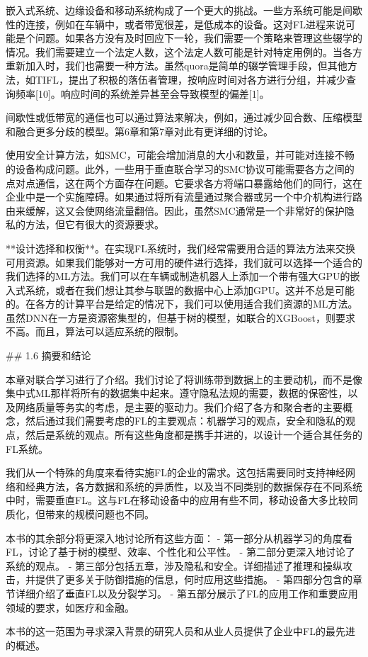 嵌入式系统、边缘设备和移动系统构成了一个更大的挑战。一些方系统可能是间歇性的连接，例如在车辆中，或者带宽很差，是低成本的设备。这对FL进程来说可能是个问题。如果各方没有及时回应下一轮，我们需要一个策略来管理这些辍学的情况。我们需要建立一个法定人数，这个法定人数可能是针对特定用例的。当各方重新加入时，我们也需要一种方法。虽然quora是简单的辍学管理手段，但其他方法，如TIFL，提出了积极的落伍者管理，按响应时间对各方进行分组，并减少查询频率[10]。响应时间的系统差异甚至会导致模型的偏差[1]。

间歇性或低带宽的通信也可以通过算法来解决，例如，通过减少回合数、压缩模型和融合更多分歧的模型。第6章和第7章对此有更详细的讨论。

使用安全计算方法，如SMC，可能会增加消息的大小和数量，并可能对连接不畅的设备构成问题。此外，一些用于垂直联合学习的SMC协议可能需要各方之间的点对点通信，这在两个方面存在问题。它要求各方将端口暴露给他们的同行，这在企业中是一个实施障碍。如果通过将所有流量通过聚合器或另一个中介机构进行路由来缓解，这又会使网络流量翻倍。因此，虽然SMC通常是一个非常好的保护隐私的方法，但它有很大的资源要求。

**设计选择和权衡**。在实现FL系统时，我们经常需要用合适的算法方法来交换可用资源。如果我们能够对一方可用的硬件进行选择，我们就可以选择一个适合的我们选择的ML方法。我们可以在车辆或制造机器人上添加一个带有强大GPU的嵌入式系统，或者在我们想让其参与联盟的数据中心上添加GPU。这并不总是可能的。在各方的计算平台是给定的情况下，我们可以使用适合我们资源的ML方法。虽然DNN在一方是资源密集型的，但基于树的模型，如联合的XGBoost，则要求不高。而且，算法可以适应系统的限制。

## 1.6 摘要和结论

本章对联合学习进行了介绍。我们讨论了将训练带到数据上的主要动机，而不是像集中式ML那样将所有的数据集中起来。遵守隐私法规的需要，数据的保密性，以及网络质量等务实的考虑，是主要的驱动力。我们介绍了各方和聚合者的主要概念，然后通过我们需要考虑的FL的主要观点：机器学习的观点，安全和隐私的观点，然后是系统的观点。所有这些角度都是携手并进的，以设计一个适合其任务的FL系统。

我们从一个特殊的角度来看待实施FL的企业的需求。这包括需要同时支持神经网络和经典方法，各方数据和系统的异质性，以及当不同类别的数据保存在不同系统中时，需要垂直FL。这与FL在移动设备中的应用有些不同，移动设备大多比较同质化，但带来的规模问题也不同。

本书的其余部分将更深入地讨论所有这些方面：
- 第一部分从机器学习的角度看FL，讨论了基于树的模型、效率、个性化和公平性。
- 第二部分更深入地讨论了系统的观点。
- 第三部分包括五章，涉及隐私和安全。详细描述了推理和操纵攻击，并提供了更多关于防御措施的信息，何时应用这些措施。
- 第四部分包含的章节详细介绍了垂直FL以及分裂学习。
- 第五部分展示了FL的应用工作和重要应用领域的要求，如医疗和金融。

本书的这一范围为寻求深入背景的研究人员和从业人员提供了企业中FL的最先进的概述。



